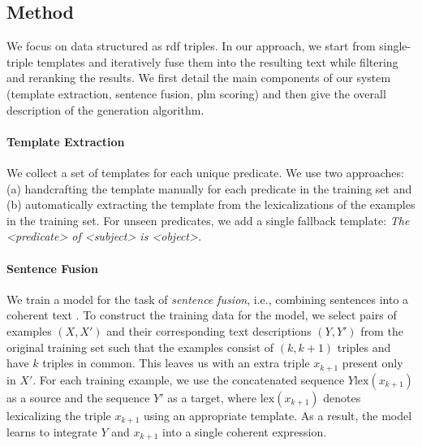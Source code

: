 

\subsection{Method}
\label{sec:text-editing-exp}
We focus on data structured as \ac{rdf} triples. In our approach, we start from single-triple templates and iteratively fuse them into the resulting text while filtering and reranking the results. We first detail the main components of our system (template extraction, sentence fusion, \ac{plm} scoring) and then give the overall description of the generation algorithm.


\paragraph{Template Extraction}
We collect a set of templates for each unique predicate. We use two approaches: (a) handcrafting the template manually for each predicate in the training set and (b) automatically extracting the template from the lexicalizations of the examples in the training set. For unseen predicates, we add a single fallback template: \textit{The <predicate> of <subject> is <object>.}


\paragraph{Sentence Fusion}
We train a model for the task of \emph{sentence fusion}, i.e., combining sentences into a coherent text \cite{barzilay2005sentence}.
To construct the training data for the model, we select pairs of examples $(X, X')$ and their corresponding text descriptions $(Y, Y')$ from the original training set such that the examples consist of $(k, k+1)$ triples and have $k$ triples in common. This leaves us with an extra triple $x_{k+1}$ present only in $X'$. For each training example, we use the concatenated sequence $Y \mathrm{lex}(x_{k+1})$ as a source and the sequence $Y'$ as a target, where $\mathrm{lex}(x_{k+1})$ denotes lexicalizing the triple $x_{k+1}$ using an appropriate template.
As a result, the model learns to integrate $Y$ and $x_{k+1}$ into a single coherent expression.


